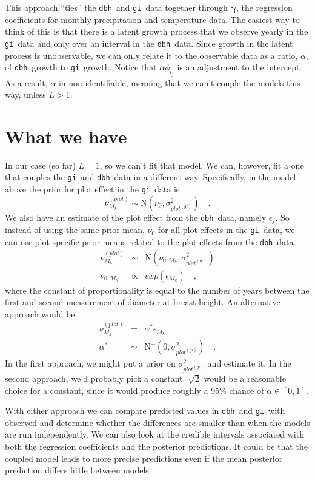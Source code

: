 \documentclass[12pt]{article}
\newcommand{\gi}{{\tt gi}}
\newcommand{\dbh}{{\tt dbh}}
\begin{document}
This approach ``ties'' the \dbh\ and \gi\ data together through
$\bm\gamma$, the regression coefficients for monthly precipitation and
temperature data. The easiest way to think of this is that there is a
latent growth process that we observe yearly in the \gi\ data and only
over an interval in the \dbh\ data. Since growth in the latent process
is unobservable, we can only relate it to the observable data as a
ratio, $\alpha$, of \dbh\ growth to \gi\ growth. Notice that
$\alpha\phi_{l_j}$ is an adjustment to the intercept. As a result,
$\alpha$ in non-identifiable, meaning that we can't couple the models
this way, unless $L > 1$.

\section*{What we have}

In our case (so far) $L = 1$, so we can't fit that model. We can,
however, fit a one that couples the \gi\ and \dbh\ data in a different
way. Specifically, in the model above the prior for plot effect in the
\gi\ data is
\[
\nu^{(plot)}_{M_k} \sim \mbox{N}(\nu_0, \sigma^2_{plot^{(gi)}})
\quad .
\]
We also have an estimate of the plot effect from the \dbh\ data,
namely $\epsilon_j$. So instead of using the same prior mean, $\nu_0$
for all plot effects in the \gi\ data, we can use plot-specific prior
means related to the plot effects from the \dbh\ data.
\begin{eqnarray*}
\nu^{(plot)}_{M_k} &\sim& \mbox{N}(\nu_{0,{M_k}},
                          \sigma^2_{plot^{(gi)}}) \\
\nu_{0,{M_k}} &\propto& exp(\epsilon_{M_k}) \quad , 
\end{eqnarray*}
where the constant of proportionality is equal to the number of years
between the first and second measurement of diameter at breast
height. An alternative approach would be
\begin{eqnarray*}
\nu^{(plot)}_{M_k} &=& \alpha^*\epsilon_{M_k} \\
\alpha^* &\sim& \mbox{N}^+(0,\sigma^2_{plot^{(gi)}}) \quad .
\end{eqnarray*}
In the first approach, we might put a prior on
$\sigma^2_{plot^{(gi)}}$ and estimate it. In the second approach, we'd
probably pick a constant. $\sqrt 2$ would be a reasonable choice for a
constant, since it would produce roughly a 95\% chance of
$\alpha \in [0,1]$. 

With either approach we can compare predicted values in \dbh\ and \gi\
with observed and determine whether the differences are smaller than
when the models are run independently. We can also look at the
credible intervals associated with both the regression coefficients
and the posterior predictions. It could be that the coupled model
leads to more precise predictions even if the mean posterior
prediction differs little between models. 
\end{document}
